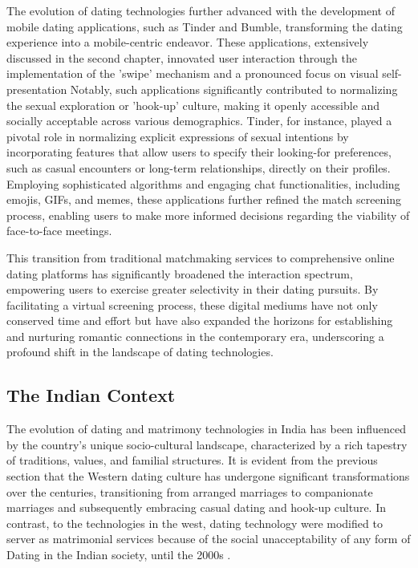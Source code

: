 The evolution of dating technologies further advanced with the development of mobile dating applications, such as Tinder and Bumble, transforming the dating experience into a mobile-centric endeavor. These applications, extensively discussed in the second chapter, innovated user interaction through the implementation of the 'swipe' mechanism and a pronounced focus on visual self-presentation\cite{noauthor_dating_nodate, marcus2016swipe} Notably, such applications significantly contributed to normalizing the sexual exploration or 'hook-up' culture, making it openly accessible and socially acceptable across various demographics\cite{noauthor_dating_nodate, marcus2016swipe}. Tinder, for instance, played a pivotal role in normalizing explicit expressions of sexual intentions by incorporating features that allow users to specify their looking-for preferences, such as casual encounters or long-term relationships, directly on their profiles. Employing sophisticated algorithms and engaging chat functionalities, including emojis, GIFs, and memes, these applications further refined the match screening process, enabling users to make more informed decisions regarding the viability of face-to-face meetings.

This transition from traditional matchmaking services to comprehensive online dating platforms has significantly broadened the interaction spectrum, empowering users to exercise greater selectivity in their dating pursuits. By facilitating a virtual screening process, these digital mediums have not only conserved time and effort but have also expanded the horizons for establishing and nurturing romantic connections in the contemporary era, underscoring a profound shift in the landscape of dating technologies.


\subsection{The Indian Context}
The evolution of dating and matrimony technologies in India has been influenced by the country's unique socio-cultural landscape, characterized by a rich tapestry of traditions, values, and familial structures. It is evident from the previous section that the Western dating culture has undergone significant transformations over the centuries, transitioning from arranged marriages to companionate marriages and subsequently embracing casual dating and hook-up culture. In contrast, to the technologies in the west, dating technology were modified to server as matrimonial services because of the social unacceptability of any form of Dating in the Indian society, until the 2000s \cite{doshi_date_2016, noauthor_modern_2017, sharma_towards_2019}. 

